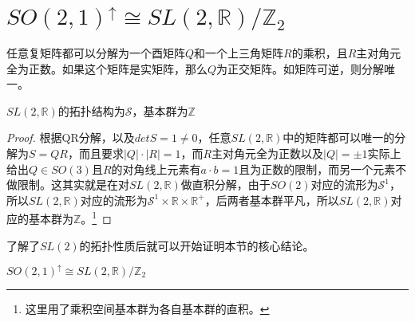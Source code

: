 \section{$SO(2,1)^\uparrow\cong SL(2,\mathbb{R})/\mathbb{Z}_2$}
\begin{lemma}[QR分解]
	任意复矩阵都可以分解为一个酉矩阵$Q$和一个上三角矩阵$R$的乘积，且$R$主对角元全为正数。如果这个矩阵是实矩阵，那么$Q$为正交矩阵。如矩阵可逆，则分解唯一。
\end{lemma}
\begin{lemma}
	$SL(2,\mathbb{R})$的拓扑结构为$\mathcal{S}$，基本群为$\mathbb{Z}$
\end{lemma}
\begin{proof}
	根据QR分解，以及$det S=1\neq 0$，任意$SL(2,\mathbb{R})$中的矩阵都可以唯一的分解为$S=QR$，而且要求$|Q|\cdot|R|=1$，而$R$主对角元全为正数以及$|Q|=\pm 1$实际上给出$Q\in SO(3)$且$R$的对角线上元素有$a\cdot b=1$且为正数的限制，而另一个元素不做限制。这其实就是在对$SL(2,\mathbb{R})$做直积分解，由于$SO(2)$对应的流形为$\mathcal{S}^1$，所以$SL(2,\mathbb{R})$对应的流形为$\mathcal{S}^1\times \mathbb{R}\times\mathbb{R}^+$，后两者基本群平凡，所以$SL(2,\mathbb{R})$对应的基本群为$\mathbb{Z}$。\footnote{这里用了乘积空间基本群为各自基本群的直积。}
\end{proof}
了解了$SL(2)$的拓扑性质后就可以开始证明本节的核心结论。
\begin{theorem}
	$SO(2,1)^\uparrow\cong SL(2,\mathbb{R})/\mathbb{Z}_2$
\end{theorem}
